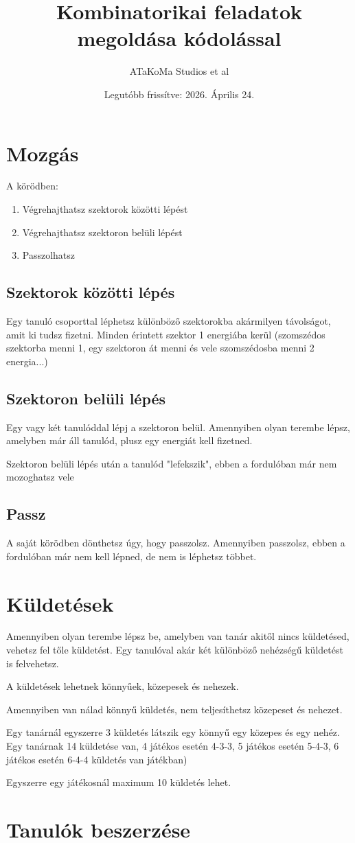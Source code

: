 \documentclass{article}
\title{Kombinatorikai feladatok megoldása kódolással}
\author{ATaKoMa Studios et al}
\date{Legutóbb frissítve: 2026. Április 24.}
\begin{document}
\maketitle
\tableofcontents
\newpage

\section{Mozgás}

A körödben: \begin{enumerate}
    \item Végrehajthatsz szektorok közötti lépést
    \item Végrehajthatsz szektoron belüli lépést
    \item Passzolhatsz
\end{enumerate}

\subsection{Szektorok közötti lépés}
Egy tanuló csoporttal léphetsz különböző szektorokba akármilyen távolságot, amit ki tudsz fizetni. Minden érintett szektor 1 energiába kerül (szomszédos szektorba menni 1, egy szektoron át menni és vele szomszédosba menni 2 energia...)

\subsection{Szektoron belüli lépés}
Egy vagy két tanulóddal lépj a szektoron belül. Amennyiben olyan terembe lépsz, amelyben már áll tanulód, plusz egy energiát kell fizetned.

Szektoron belüli lépés után a tanulód "lefekszik", ebben a fordulóban már nem mozoghatsz vele

\subsection{Passz}
A saját körödben dönthetsz úgy, hogy passzolsz. Amennyiben passzolsz, ebben a fordulóban már nem kell lépned, de nem is léphetsz többet.

\section{Küldetések}

Amennyiben olyan terembe lépsz be, amelyben van tanár akitől nincs küldetésed, vehetsz fel tőle küldetést. Egy tanulóval akár két különböző nehézségű küldetést is felvehetsz.

A küldetések lehetnek könnyűek, közepesek és nehezek. 

Amennyiben van nálad könnyű küldetés, nem teljesíthetsz közepeset és nehezet.  

Egy tanárnál egyszerre 3 küldetés látszik egy könnyű egy közepes és egy nehéz. Egy tanárnak 14  küldetése van, 4 játékos esetén 4-3-3, 5 játékos esetén 5-4-3, 6 játékos esetén 6-4-4 küldetés van játékban)

Egyszerre egy játékosnál maximum 10 küldetés lehet. 

\section{Tanulók beszerzése}
\end{document}
